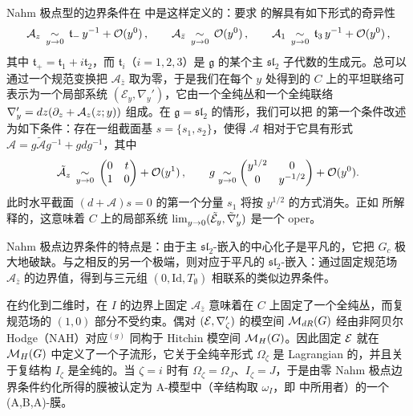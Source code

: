 Nahm 极点型的边界条件在 \cite{GW} 中是这样定义的：要求  的解具有如下形式的奇异性
\begin{equation}\label{Nahm}
\mathcal{A}_z\,\underset{y\to 0}{\sim}\,\mathfrak{t}_- \,y^{-1}+\mathcal{O}(y^0)\,,\qquad
\mathcal{A}_{\bar{z}}\,\underset{y\to 0}{\sim}\,\mathcal{O}(y^0)\,,\qquad
\mathcal{A}_1\,\underset{y\to 0}{\sim}\,\mathfrak{t}_3 \,y^{-1}+\mathcal{O}(y^0)\,,
\end{equation}
其中 $\mathfrak{t}_+=\mathfrak{t}_1+i\mathfrak{t}_2$，而 $\mathfrak{t}_i$（$i=1,2,3$）是 $\mathfrak{g}$ 的某个主 $\mathfrak{sl}_2$ 子代数的生成元。总可以通过一个规范变换把 $\mathcal{A}_{\bar{z}}$ 取为零，于是我们在每个 $y$ 处得到的 $C$ 上的平坦联络可表示为一个局部系统 $(\mathcal{E}_{y},\nabla_{y}')$，它由一个全纯丛和一个全纯联络 $\nabla_{y}'=dz(\partial_z+\mathcal{A}_z(z;y))$ 组成。在 $\mathfrak{g}=\mathfrak{sl}_2$ 的情形，我们可以把  的第一个条件改述为如下条件：存在一组截面基 $s=\{s_1,s_2\}$，使得 $\mathcal{A}$ 相对于它具有形式 $\mathcal{A}=g\tilde{\mathcal{A}}g^{-1}+gd g^{-1}$，其中
\begin{equation}\label{Nahm'}
\tilde{\mathcal{A}}_z\,\underset{y\to 0}{\sim}\,\bigg(\begin{matrix} 0 & t\\ 1 & 0\end{matrix}\bigg)+\mathcal{O}(y^1) \,,
\qquad g\underset{y\to 0}{\sim} \bigg(\begin{matrix} y^{1/2}& 0 \\  0& y^{-1/2} \end{matrix}\bigg) +\mathcal{O}(y^0).
\end{equation}
此时水平截面 $(d+\mathcal{A})s=0$ 的第一个分量 $s_1$ 将按 $y^{1/2}$ 的方式消失。正如 \cite{GW} 所解释的，这意味着 $C$ 上的局部系统 $\lim_{y\to 0}^{}(\tilde{\mathcal{E}}_{y},\tilde{\nabla}_{y}')$ 是一个 oper。

Nahm 极点边界条件的特点是：由于主 $\mathfrak{sl}_2$-嵌入的中心化子是平凡的，它把 $G_c$ 极大地破缺。与之相反的另一个极端，则对应于平凡的 $\mathfrak{sl}_2$-嵌入：通过固定规范场 $\mathcal{A}_{\bar{z}}$ 的边界值，得到与三元组 $(0,\mathrm{Id},T_\emptyset)$ 相联系的类似边界条件。

在约化到二维时，在 $I$ 的边界上固定 $\mathcal{A}_{\bar{z}}$ 意味着在 $C$ 上固定了一个全纯丛，而复规范场的 $(1,0)$ 部分不受约束。偶对 $(\mathcal{E},\nabla_\zeta')$ 的模空间 $\mathcal{M}_{dR}(G)$ 经由非阿贝尔 Hodge（NAH）对应$^{(g)}$ 同构于 Hitchin 模空间 $\mathcal{M}_H(G)$。因此固定 $\mathcal{E}$ 就在 $\mathcal{M}_H(G)$ 中定义了一个子流形，它关于全纯辛形式 $\Omega_\zeta$ 是 Lagrangian 的，并且关于复结构 $I_\zeta$ 是全纯的。当 $\zeta=i$ 时有 $\Omega_\zeta=\Omega_J$、$I_\zeta=J$，于是由零 Nahm 极点边界条件约化所得的膜被认定为 A-模型中（辛结构取 $\omega_I$，即 \cite{NW} 中所用者）的一个 (A,B,A)-膜。

